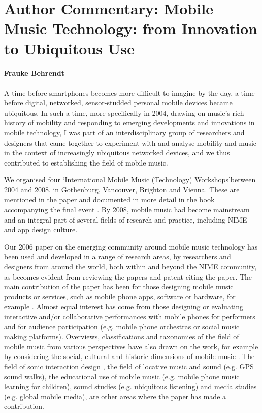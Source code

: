 \section*{Author Commentary: Mobile Music Technology: from Innovation to Ubiquitous Use}
\paragraph{Frauke Behrendt}

A time before smartphones becomes more difficult to imagine by the day, a time before digital, networked, sensor-studded personal mobile devices became ubiquitous. In such a time, more specifically in 2004, drawing on music's rich history of mobility and responding to emerging developments and innovations in mobile technology, I was part of an interdisciplinary group of researchers and designers that came together to experiment with and analyse mobility and music in the context of increasingly ubiquitous networked devices, and we thus contributed to establishing the field of mobile music.

We organised four \lq International Mobile Music (Technology) Workshops\rq  between 2004 and 2008, in Gothenburg, Vancouver, Brighton and Vienna. These are mentioned in the paper and documented in more detail in the book accompanying the final event \cite{Kirisits:2008}. By 2008, mobile music had become mainstream and an integral part of several fields of research and practice, including NIME and app design culture.

Our 2006 paper on the emerging community around mobile music technology has been used and developed in a range of research areas, by researchers and designers from around the world, both within and beyond the NIME community, as becomes evident from reviewing the papers and patent citing the paper. The main contribution of the paper has been for those designing mobile music products or services, such as mobile phone apps, software or hardware, for example \cite{Wang:2009}. Almost equal interest has come from those designing or evaluating interactive and/or collaborative performances with mobile phones for performers and for audience participation (e.g. mobile phone orchestras or social music making platforms). Overviews, classifications and taxonomies of the field of mobile music from various perspectives have also drawn on the work, for example by considering the social, cultural and historic dimensions of mobile music \cite{Gopinath:2014}. The field of sonic interaction design \cite{Rocchesso:2008}, the field of locative music and sound (e.g. GPS sound walks), the educational use of mobile music (e.g. mobile phone music learning for children), sound studies (e.g. ubiquitous listening) and media studies (e.g. global mobile media), are other areas where the paper has made a contribution.

